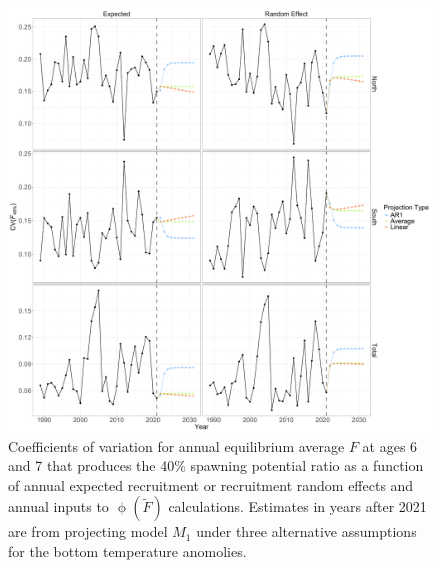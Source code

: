 \documentclass[
]{article}
\begin{document}
\begin{figure}

{\centering \includegraphics[height=0.95\textheight]{proj_F40_CV} 

}

\caption{Coefficients of variation for annual equilibrium average $F$ at ages 6 and 7 that produces the 40\% spawning potential ratio as a function of annual expected recruitment or recruitment random effects and annual inputs to $\upphi(\widetilde{F})$ calculations. Estimates in years after 2021 are from projecting model $M_1$ under three alternative assumptions for the bottom temperature anomolies.}\label{fig:annual-F40-cvs}
\end{figure}
\end{document}
